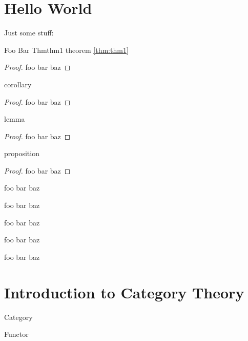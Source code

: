 \chapter{Hello World}
Just some stuff:

\begin{theorem}{Foo Bar Thm}{thm1}
theorem
\ref{thm:thm1}
\end{theorem}

\begin{proof}
foo bar baz
\end{proof}



\begin{corollary}{}{}
corollary
\end{corollary}

\begin{proof}
foo bar baz
\end{proof}


\begin{lemma}{}{}
lemma
\end{lemma}


\begin{proof}
foo bar baz
\end{proof}


\begin{proposition}{}{}
proposition
\end{proposition}

\begin{proof}
foo bar baz
\end{proof}

\begin{fact}{}{}
foo bar baz
\end{fact}

\begin{notation}{}{}
foo bar baz
\end{notation}

\begin{definition}{}{}
foo bar baz
\end{definition}

\begin{example}{}{}
foo bar baz
\end{example}

\begin{myremark}{}{}
foo bar baz
\end{myremark}

\chapter{Introduction to Category Theory}

\begin{definition}{Category}{}
\end{definition}

\begin{definition}{Functor}{}
\end{definition}